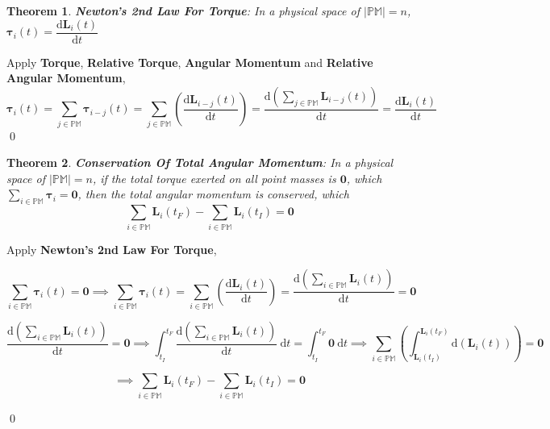 \documentclass[12pt]{amsart}
\newtheorem{theorem}{Theorem}[section]
\renewenvironment{proof}{{\bfseries Proof.}}{\qed}
\begin{document}
\begin{theorem}
    \textbf{Newton's 2nd Law For Torque}: In a physical space of $\left | \mathbb{PM} \right | = n$, $ \boldsymbol{\tau}_{i}(t) = \dfrac{\mathrm{d} \boldsymbol{L}_i(t) }{\mathrm{d} t} $
\end{theorem}

\begin{proof}
    
    Apply \textbf{Torque}, \textbf{Relative Torque}, \textbf{Angular Momentum} and \textbf{Relative Angular Momentum},
    $$ \boldsymbol{\tau}_{i}(t) =  \displaystyle \sum_{j \in \mathbb{PM}} \boldsymbol{\tau}_{i-j} (t) = \displaystyle \sum_{j \in \mathbb{PM}} \left (  \dfrac{\mathrm{d} \boldsymbol{L}_{i-j}(t)}{\mathrm{d} t} \right ) =  \dfrac{\mathrm{d} \left (  \displaystyle \sum_{j \in \mathbb{PM}} \boldsymbol{L}_{i-j}(t) \right ) }{\mathrm{d} t} = \dfrac{\mathrm{d} \boldsymbol{L}_i(t) }{\mathrm{d} t} $$
\end{proof}

\begin{theorem}
\textbf{Conservation Of Total Angular Momentum}: In a physical space of $\left | \mathbb{PM} \right | = n$, if the total torque exerted on all point masses is $\boldsymbol{0}$, which $\displaystyle\sum_{i \in \mathbb{PM}}\boldsymbol{\tau}_{i}=\boldsymbol{0}$, then the total angular momentum is conserved, which $$ \sum_{i \in \mathbb{PM}} \boldsymbol{L}_{i}(t_F)- \sum_{i \in \mathbb{PM}} \boldsymbol{L}_{i}(t_I) = \boldsymbol{0} $$
\end{theorem}

\begin{proof}

Apply \textbf{Newton's 2nd Law For Torque},

$$ \sum_{i \in \mathbb{PM}} \boldsymbol{\tau}_i(t)=\boldsymbol{0} \implies \sum_{i \in \mathbb{PM}} \boldsymbol{\tau}_i(t)= \sum_{i \in \mathbb{PM}} \left(\dfrac{\mathrm{d} \boldsymbol{L}_i(t)}{\mathrm{d} t}\right)= \dfrac{\displaystyle \mathrm{d}\left( \sum_{i \in \mathbb{PM}} \boldsymbol{L}_i(t)\right)}{\mathrm{d} t} =\boldsymbol{0} $$

$$ \dfrac{\displaystyle\mathrm{d}\left( \sum_{i \in \mathbb{PM}} \boldsymbol{L}_i(t)\right)}{\mathrm{d} t}=\boldsymbol{0} \implies \int_{t_I}^{t_F} \dfrac{\displaystyle \mathrm{d}\left( \sum_{i \in \mathbb{PM}} \boldsymbol{L}_i(t)\right)}{\mathrm{d} t} \ \mathrm{d} t = \int_{t_I}^{t_F} \boldsymbol{0} \ \mathrm{d} t \implies \sum_{i \in \mathbb{PM}} \left( \int_{\boldsymbol{L}_{i}(t_I)}^{\boldsymbol{L}_{i}(t_F)} \mathrm{d} \left( \boldsymbol{L}_i (t)\right) \right) = \boldsymbol{0} $$

$$ \implies \sum_{i \in \mathbb{PM}} \boldsymbol{L}_{i}(t_F)- \sum_{i \in \mathbb{PM}} \boldsymbol{L}_{i}(t_I) = \boldsymbol{0} $$

\end{proof}
\end{document}

